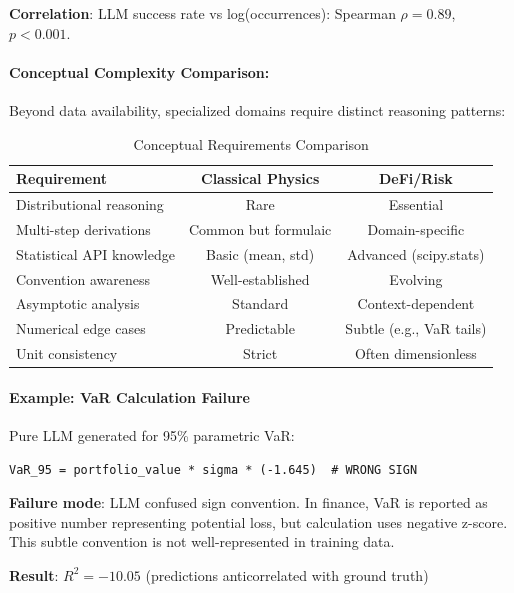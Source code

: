 \documentclass[11pt,a4paper]{article}
\begin{document}
\textbf{Correlation}: LLM success rate vs log(occurrences): Spearman $\rho = 0.89$, $p < 0.001$.

\paragraph{Conceptual Complexity Comparison:}

Beyond data availability, specialized domains require distinct reasoning patterns:

\begin{table}[H]
\centering
\caption{Conceptual Requirements Comparison}
\label{tab:conceptual_complexity}
\begin{tabular}{@{}lcc@{}}
\toprule
\textbf{Requirement} & \textbf{Classical Physics} & \textbf{DeFi/Risk} \\
\midrule
Distributional reasoning & Rare & Essential \\
Multi-step derivations & Common but formulaic & Domain-specific \\
Statistical API knowledge & Basic (mean, std) & Advanced (scipy.stats) \\
Convention awareness & Well-established & Evolving \\
Asymptotic analysis & Standard & Context-dependent \\
Numerical edge cases & Predictable & Subtle (e.g., VaR tails) \\
Unit consistency & Strict & Often dimensionless \\
\bottomrule
\end{tabular}
\end{table}

\paragraph{Example: VaR Calculation Failure}

Pure LLM generated for 95\% parametric VaR:
\begin{verbatim}
VaR_95 = portfolio_value * sigma * (-1.645)  # WRONG SIGN
\end{verbatim}

\textbf{Failure mode}: LLM confused sign convention. In finance, VaR is reported as positive number representing potential loss, but calculation uses negative z-score. This subtle convention is not well-represented in training data\citep{lewkowycz2022minerva}.

\textbf{Result}: $R^2 = -10.05$ (predictions anticorrelated with ground truth)
\end{document}
